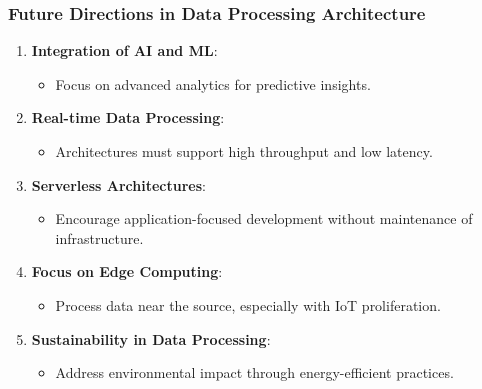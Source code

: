 \documentclass[aspectratio=169]{beamer}
\begin{document}
\begin{frame}[fragile]
    \frametitle{Future Directions in Data Processing Architecture}
    \begin{enumerate}
        \item \textbf{Integration of AI and ML}:
        \begin{itemize}
            \item Focus on advanced analytics for predictive insights.
        \end{itemize}

        \item \textbf{Real-time Data Processing}:
        \begin{itemize}
            \item Architectures must support high throughput and low latency.
        \end{itemize}

        \item \textbf{Serverless Architectures}:
        \begin{itemize}
            \item Encourage application-focused development without maintenance of infrastructure.
        \end{itemize}

        \item \textbf{Focus on Edge Computing}:
        \begin{itemize}
            \item Process data near the source, especially with IoT proliferation.
        \end{itemize}

        \item \textbf{Sustainability in Data Processing}:
        \begin{itemize}
            \item Address environmental impact through energy-efficient practices.
        \end{itemize}
    \end{enumerate}
\end{frame}
\end{document}
